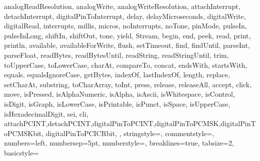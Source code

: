 {{                analogReadResolution, analogWrite, analogWriteResolution, 
                attachInterrupt, detachInterrupt, digitalPinToInterrupt, delay, 
                delayMicroseconds, digitalWrite, digitalRead, interrupts, millis, 
                micros, noInterrupts, noTone, pinMode, pulseIn, pulseInLong, shiftIn, 
                shiftOut, tone, yield, Stream, begin, end, peek, read, print, 
                println, available, availableForWrite, flush, setTimeout, find, 
                findUntil, parseInt, parseFloat, readBytes, readBytesUntil, readString, 
                readStringUntil, trim, toUpperCase, toLowerCase, charAt, compareTo, 
                concat, endsWith, startsWith, equals, equalsIgnoreCase, getBytes, 
                indexOf, lastIndexOf, length, replace, setCharAt, substring, 
                toCharArray, toInt, press, release, releaseAll, accept, click, move, 
                isPressed, isAlphaNumeric, isAlpha, isAscii, isWhitespace, isControl, 
                isDigit, isGraph, isLowerCase, isPrintable, isPunct, isSpace, 
                isUpperCase, isHexadecimalDigit, sei, cli,
                attachPCINT,detachPCINT,digitalPinToPCINT,digitalPinToPCMSK,digitalPinToPCMSKbit,
                digitalPinToPCICRbit,
                },      
%
%
  stringstyle=\color{arduinoDarkBlue},    
  commentstyle=\color{arduinoGrey},    
%          
%   
  numbers=left,                    
  numbersep=5pt,                   
  numberstyle=\color{arduinoGrey},    
%
%
  breaklines=true,                    %
  tabsize=2,         
  basicstyle=\ttfamily  
}